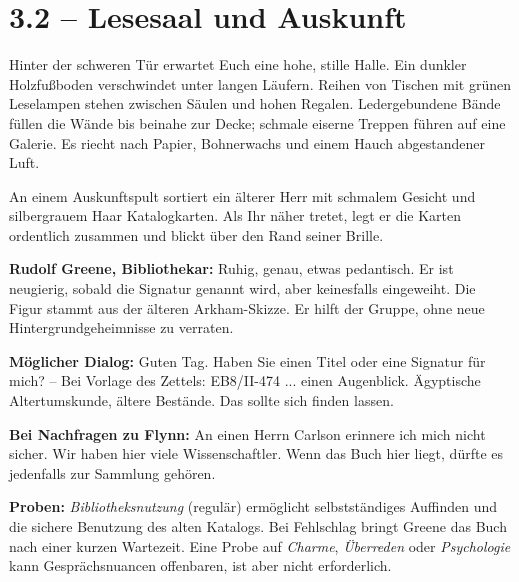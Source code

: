 \section{3.2 -- Lesesaal und Auskunft}
\begin{vorlesetextalle}
Hinter der schweren Tür erwartet Euch eine hohe, stille Halle. Ein dunkler Holzfu\ss{}boden verschwindet unter langen Läufern. Reihen von Tischen mit grünen Leselampen stehen zwischen Säulen und hohen Regalen. Ledergebundene Bände füllen die Wände bis beinahe zur Decke; schmale eiserne Treppen führen auf eine Galerie. Es riecht nach Papier, Bohnerwachs und einem Hauch abgestandener Luft.

An einem Auskunftspult sortiert ein älterer Herr mit schmalem Gesicht und silbergrauem Haar Katalogkarten. Als Ihr näher tretet, legt er die Karten ordentlich zusammen und blickt über den Rand seiner Brille.
\end{vorlesetextalle}
\begin{meisterinfo}
\textbf{Rudolf Greene, Bibliothekar:} Ruhig, genau, etwas pedantisch. Er ist neugierig, sobald die Signatur genannt wird, aber keinesfalls eingeweiht. Die Figur stammt aus der älteren Arkham-Skizze. Er hilft der Gruppe, ohne neue Hintergrundgeheimnisse zu verraten.

\textbf{Möglicher Dialog:} \glqq{}Guten Tag. Haben Sie einen Titel oder eine Signatur für mich?\grqq{} -- Bei Vorlage des Zettels: \glqq{}EB8/II-474 ... einen Augenblick. Ägyptische Altertumskunde, ältere Bestände. Das sollte sich finden lassen.\grqq{}

\textbf{Bei Nachfragen zu Flynn:} \glqq{}An einen Herrn Carlson erinnere ich mich nicht sicher. Wir haben hier viele Wissenschaftler. Wenn das Buch hier liegt, dürfte es jedenfalls zur Sammlung gehören.\grqq{}

\textbf{Proben:} \emph{Bibliotheksnutzung} (regulär) ermöglicht selbstständiges Auffinden und die sichere Benutzung des alten Katalogs. Bei Fehlschlag bringt Greene das Buch nach einer kurzen Wartezeit. Eine Probe auf \emph{Charme}, \emph{Überreden} oder \emph{Psychologie} kann Gesprächsnuancen offenbaren, ist aber nicht erforderlich.
\end{meisterinfo}

